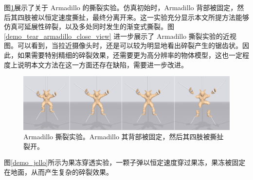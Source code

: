 图\ref{demo_tear_armadillo}展示了关于 Armadillo 的撕裂实验。仿真初始时，Armadillo 背部被固定，然后其四肢被以恒定速度撕扯，最终分离开来。这一实验充分显示本文所提方法能够仿真可延展性碎裂，以及多处同时发生的渐变式撕裂。图\ref{demo_tear_armadillo_close_view} 进一步展示了 Armadillo 撕裂实验的近视图。可以看到，当拉近摄像头时，还是可以较为明显地看出碎裂产生的锯齿状。因此，如果需要特别精细的碎裂效果，还需要更为高分辨率的物体模型，这也一定程度上说明本文方法在这一方面还存在缺陷，需要进一步改进。

\begin{figure}[!htb]
  \centering
  \captionsetup{justification=centering}
  \includegraphics[width=\linewidth]{chap/image/demo_tear_armadillo}

  \caption{\label{demo_tear_armadillo}
           Armadillo 撕裂实验。Armadillo 其背部被固定，然后其四肢被撕扯裂开。
          }
\end{figure}

图\ref{demo_jello}所示为果冻穿透实验，一颗子弹以恒定速度穿过果冻，果冻被固定在地面，从而产生复杂的碎裂效果。

